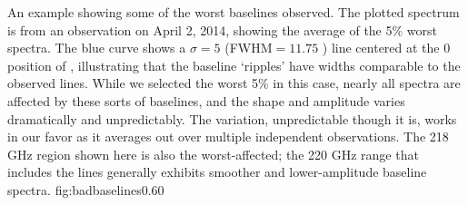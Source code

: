 {An example showing some of the worst baselines observed.  The plotted spectrum
is from an observation on April 2, 2014, showing the average of the 5\% worst
spectra.  The blue curve shows a $\sigma=5$ \kms (FWHM$=11.75$ \kms) line centered
at the 0 \kms position of \para \threeohthree,
illustrating that the baseline `ripples' have widths comparable to the observed
lines.  While we selected the worst 5\% in this case, nearly all spectra are
affected by these sorts of baselines, and the shape and amplitude varies
dramatically and unpredictably.  The variation, unpredictable though it is,
works in our favor as it averages out over multiple independent observations.
The 218 GHz region shown here is also the worst-affected; the 220 GHz range
that includes the \thirteenco lines generally exhibits smoother and
lower-amplitude baseline spectra.}
{fig:badbaselines}{0.6}{0}






